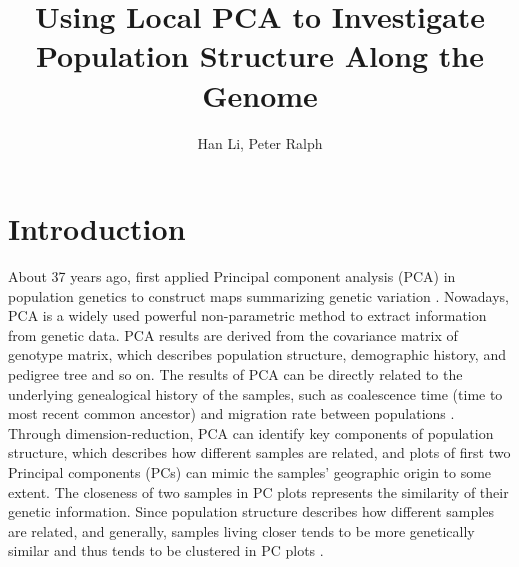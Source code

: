 \documentclass[11pt, oneside]{article}   	%
\title{Using Local PCA to Investigate Population Structure Along the Genome}
\author{Han Li, Peter Ralph}
\begin{document}
\maketitle
\doublespacing
\section{Introduction}

About 37 years ago, \citet{menozzi1978synthetic} first applied Principal component analysis (PCA) in population genetics to construct maps summarizing genetic variation \citep{menozzi1978synthetic}. Nowadays, PCA is a widely used powerful non-parametric method to extract information from genetic data. PCA results are derived from the covariance matrix of genotype matrix, which describes population structure, demographic history, and pedigree tree and so on. The results of PCA can be directly related to the underlying genealogical history of the samples, such as coalescence time (time to most recent common ancestor) and migration rate between populations \citep{menozzi1978synthetic,novembre2008interpreting,mcvean2009genealogical}. Through dimension-reduction, PCA can identify key components of population structure, which describes how different samples are related, and plots of first two Principal components (PCs) can mimic the samples' geographic origin to some extent. The closeness of two samples in PC plots represents the similarity of their genetic information. Since population structure describes how different samples are related, and generally, samples living closer tends to be more genetically similar and thus tends to be clustered in PC plots \citep{novembre2008genes,patterson2006population}.
 
\end{document}
